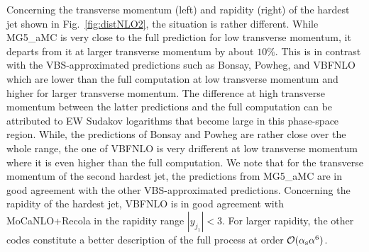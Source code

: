 Concerning the transverse momentum (left) and rapidity (right) of the hardest jet shown in Fig.~\ref{fig:distNLO2}, the situation is rather different.
While {\sc MG5\_aMC} is very close to the full prediction for low transverse momentum, it departs from it 
at larger transverse momentum by about $10\%$.
This is in contrast with the VBS-approximated predictions such as {\sc Bonsay}, {\sc Powheg}, and {\sc VBFNLO} which are lower than the full computation at low transverse momentum and higher for larger transverse momentum.
The difference at high transverse momentum between the latter predictions and the full computation can be attributed to EW Sudakov logarithms that become large in this phase-space region.
While, the predictions of {\sc Bonsay} and {\sc Powheg} are rather close over the whole range, the one of {\sc VBFNLO} is very drifferent at low transverse momentum where it is even higher than the full computation.
We note that for the transverse momentum of the second hardest jet, the predictions from {\sc MG5\_aMC} are in good agreement with the other VBS-approximated predictions.
Concerning the rapidity of the hardest jet, {\sc VBFNLO} is in good agreement with {\sc MoCaNLO}+{\sc Recola} in the rapidity range $|y_{j_1}| < 3$.
For larger rapidity, the other codes constitute a better description of the full process at order $\mathcal{O}(\alpha_{\rm s}\alpha^6)$.

